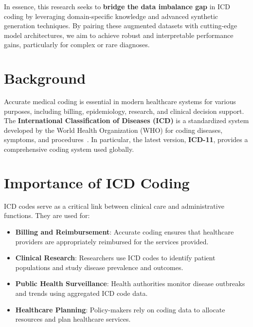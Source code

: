 In essence, this research seeks to \textbf{bridge the data imbalance gap} in ICD coding by leveraging domain-specific knowledge and advanced synthetic generation techniques. By pairing these augmented datasets with cutting-edge model architectures, we aim to achieve robust and interpretable performance gains, particularly for complex or rare diagnoses.

\section{Background}
Accurate medical coding is essential in modern healthcare systems for various purposes, including billing, epidemiology, research, and clinical decision support. The \textbf{International Classification of Diseases (ICD)} is a standardized system developed by the World Health Organization (WHO) for coding diseases, symptoms, and procedures~\cite{who2019icd11}. In particular, the latest version, \textbf{ICD-11}, provides a comprehensive coding system used globally.

\section{Importance of ICD Coding}
ICD codes serve as a critical link between clinical care and administrative functions. They are used for:
\begin{itemize}
    \item \textbf{Billing and Reimbursement}: Accurate coding ensures that healthcare providers are appropriately reimbursed for the services provided.
    \item \textbf{Clinical Research}: Researchers use ICD codes to identify patient populations and study disease prevalence and outcomes.
    \item \textbf{Public Health Surveillance}: Health authorities monitor disease outbreaks and trends using aggregated ICD code data.
    \item \textbf{Healthcare Planning}: Policy-makers rely on coding data to allocate resources and plan healthcare services.
\end{itemize}

